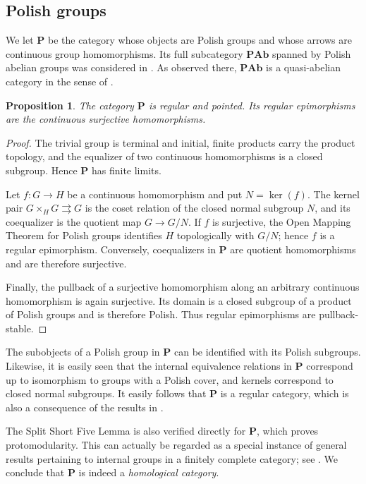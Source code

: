 \documentclass[12pt]{amsart}
\newtheorem{proposition}[theorem]{Proposition}
\theoremstyle{definition}
\begin{document}
\subsection{Polish groups}

We let $\mathbf{P}$ be the category whose objects are Polish groups and
whose arrows are continuous group homomorphisms. Its full subcategory $%
\mathbf{PAb}$ spanned by Polish abelian groups was considered in \cite%
{lupini_looking_2024}. As observed there, $\mathbf{PAb}$ is a quasi-abelian
category in the sense of \cite{schneiders_quasi-abelian_1999}.

\begin{proposition}
\label{prop:regularity} The category $\mathbf{P}$ is regular and pointed.
Its regular epimorphisms are the continuous surjective homomorphisms.
\end{proposition}

\begin{proof}
The trivial group is terminal and initial, finite products carry the product
topology, and the equalizer of two continuous homomorphisms is a closed
subgroup. Hence $\mathbf{P}$ has finite limits.

Let $f:G\rightarrow H$ be a continuous homomorphism and put $N=\ker (f)$.
The kernel pair $G\times _{H}G\rightrightarrows G$ is the coset relation of
the closed normal subgroup $N$, and its coequalizer is the quotient map $%
G\rightarrow G/N$. If $f$ is surjective, the Open Mapping Theorem for Polish
groups identifies $H$ topologically with $G/N$; hence $f$ is a regular
epimorphism. Conversely, coequalizers in $\mathbf{P}$ are quotient
homomorphisms and are therefore surjective.

Finally, the pullback of a surjective homomorphism along an arbitrary
continuous homomorphism is again surjective. Its domain is a closed subgroup
of a product of Polish groups and is therefore Polish. Thus regular
epimorphisms are pullback-stable.
\end{proof}

The subobjects of a Polish group in $\mathbf{P}$ can be identified with its
Polish subgroups. Likewise, it is easily seen that the internal equivalence
relations in $\mathbf{P}$ correspond up to isomorphism to groups with a
Polish cover, and kernels correspond to closed normal subgroups. It easily
follows that $\mathbf{P}$ is a regular category, which is also a consequence
of the results in \cite{borceux_topological_2005}.

The Split Short Five Lemma is also verified directly for $\mathbf{P}$, which
proves protomodularity. This can actually be regarded as a special instance
of general results pertaining to internal groups in a finitely complete
category; see \cite{bourn_regular_2004,borceux_malcev_2004}. We conclude
that $\mathbf{P}$ is indeed a \emph{homological category}.
\end{document}
